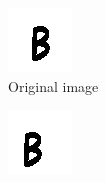 \documentclass{article}
\begin{document}
\begin{figure}
\begin{subfigure}{0.11\textwidth}
  \centering
  \includegraphics[width=\linewidth]{images/original}
  \caption{Original image}
\end{subfigure}
\begin{subfigure}{0.11\textwidth}
  \centering
  \includegraphics[width=\linewidth]{images/translated}

\end{subfigure}
\end{figure}
\end{document}
